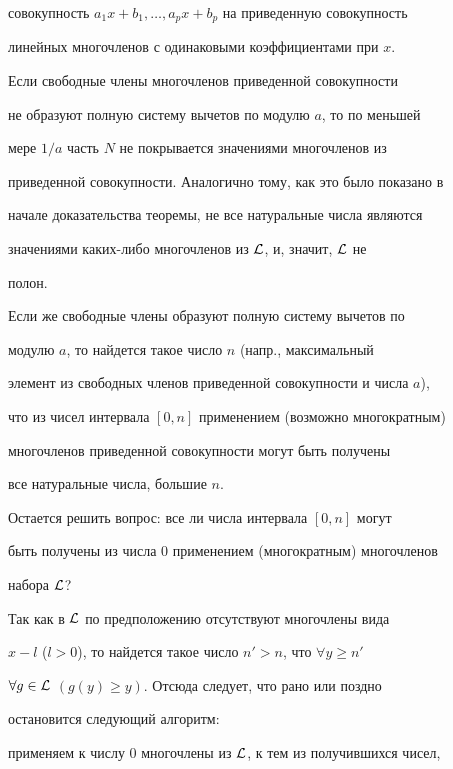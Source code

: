 \begin{pf}
совокупность $a_1x+b_1,\dotsc,a_p x+b_p$ на приведенную совокупность 


линейных многочленов с одинаковыми коэффициентами при $x$. 


 


Если свободные члены многочленов приведенной совокупности 


не образуют полную систему вычетов по модулю $a$, то по меньшей 


мере $1/a$ часть $N$ не покрывается значениями многочленов из 


приведенной совокупности. Аналогично тому, как это было показано в 


начале доказательства теоремы, не все натуральные числа являются 


значениями каких-либо многочленов из $\cal L$, и, значит, $\cal L$ не 


полон. 


 


Если же свободные члены образуют полную систему вычетов по 


модулю $a$, то найдется такое число $n$ (напр., максимальный 


элемент из свободных членов приведенной совокупности и числа $a$), 


что из чисел интервала $[0,n]$ применением (возможно многократным) 


многочленов приведенной совокупности могут быть получены 


все натуральные числа, большие $n$. 


 


Остается решить вопрос: все ли числа интервала $[0,n]$ могут 


быть получены из числа 0 применением (многократным) многочленов 


набора $\cal L$? 


 


Так как в $\cal L$ по предположению отсутствуют многочлены вида 


$x-l$ ($l>0$), то найдется такое число $n'>n$, что $\forall y\ge n'$ 


$\forall g\in\cal L$ $(g(y)\ge y)$. Отсюда следует, что рано или поздно 


остановится следующий алгоритм: 


применяем к числу 0 многочлены из $\cal L$, к тем из получившихся чисел, 



\end{pf}
